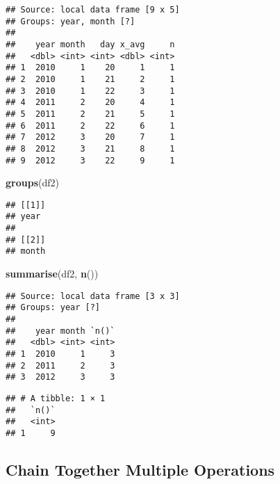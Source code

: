 \documentclass[]{book}
\newenvironment{Shaded}{\begin{snugshade}}{\end{snugshade}}
\newcommand{\KeywordTok}[1]{\textcolor[rgb]{0.13,0.29,0.53}{\textbf{{#1}}}}
\newcommand{\StringTok}[1]{\textcolor[rgb]{0.31,0.60,0.02}{{#1}}}
\newcommand{\NormalTok}[1]{{#1}}
\begin{document}
\begin{verbatim}
## Source: local data frame [9 x 5]
## Groups: year, month [?]
## 
##    year month   day x_avg     n
##   <dbl> <int> <int> <dbl> <int>
## 1  2010     1    20     1     1
## 2  2010     1    21     2     1
## 3  2010     1    22     3     1
## 4  2011     2    20     4     1
## 5  2011     2    21     5     1
## 6  2011     2    22     6     1
## 7  2012     3    20     7     1
## 8  2012     3    21     8     1
## 9  2012     3    22     9     1
\end{verbatim}

\begin{Shaded}
\begin{Highlighting}[]
\KeywordTok{groups}\NormalTok{(df2)}
\end{Highlighting}
\end{Shaded}

\begin{verbatim}
## [[1]]
## year
## 
## [[2]]
## month
\end{verbatim}

\begin{Shaded}
\begin{Highlighting}[]
\KeywordTok{summarise}\NormalTok{(df2, }\KeywordTok{n}\NormalTok{())}
\end{Highlighting}
\end{Shaded}

\begin{verbatim}
## Source: local data frame [3 x 3]
## Groups: year [?]
## 
##    year month `n()`
##   <dbl> <int> <int>
## 1  2010     1     3
## 2  2011     2     3
## 3  2012     3     3
\end{verbatim}

\begin{Shaded}
\end{Shaded}

\begin{verbatim}
## # A tibble: 1 × 1
##   `n()`
##   <int>
## 1     9
\end{verbatim}

\subsection{Chain Together Multiple
Operations}\label{chain-together-multiple-operations}
\end{document}

